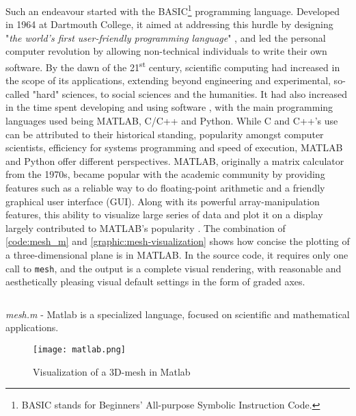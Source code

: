 Such an endeavour started with the BASIC\footnote{BASIC stands for Beginners' All-purpose Symbolic Instruction Code.} programming language. Developed in 1964 at Dartmouth College, it aimed at addressing this hurdle by designing "\emph{the world's first user-friendly programming language}" \citep{brooks_finally_2019}, and led the personal computer revolution by allowing non-technical individuals to write their own software. By the dawn of the 21\textsuperscript{st} century, scientific computing had increased in the scope of its applications, extending beyond engineering and experimental, so-called "hard" sciences, to social sciences and the humanities. It had also increased in the time spent developing and using software \citep{prabhu_survey_2011,hannay_how_2009}, with the main programming languages used being MATLAB, C/C++ and Python. While C and C++'s use can be attributed to their historical standing, popularity amongst computer scientists, efficiency for systems programming and speed of execution, MATLAB and Python offer different perspectives. MATLAB, originally a matrix calculator from the 1970s, became popular with the academic community by providing features such as a reliable way to do floating-point arithmetic and a friendly graphical user interface (GUI). Along with its powerful array-manipulation features, this ability to visualize large series of data and plot it on a display largely contributed to MATLAB's popularity \citep{moler_history_2020}. The combination of \autoref{code:mesh_m} and \autoref{graphic:mesh-visualization} shows how concise the plotting of a three-dimensional plane is in MATLAB. In the source code, it requires only one call to \lstinline{mesh}, and the output is a complete visual rendering, with reasonable and aesthetically pleasing visual default settings in the form of graded axes.

\begin{listing}
  \inputminted{matlab}{./corpus/mesh.matlab}
  \caption{\emph{mesh.m} - Matlab is a specialized language, focused on scientific and mathematical applications.}
  \label{code:mesh_m}
\end{listing}

\begin{figure}
  \texttt{[image: matlab.png]}
  \caption{Visualization of a 3D-mesh in Matlab}
  \label{graphic:mesh-visualization}
\end{figure}

